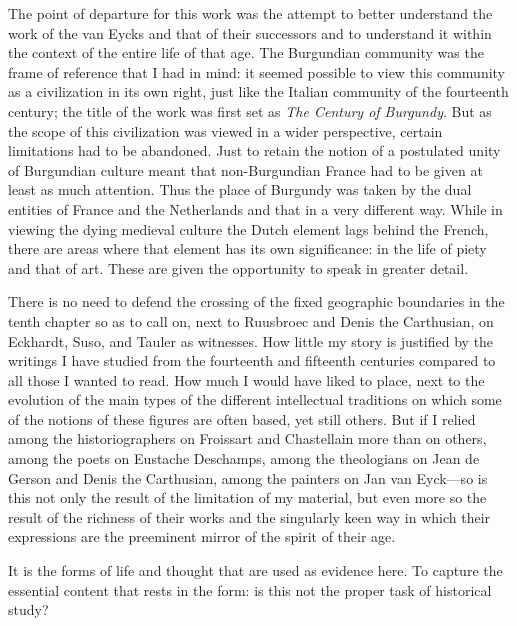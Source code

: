 The point of departure for this work was the attempt to better
understand the work of the van Eycks and that of their successors and to
understand it within the context of the entire life of that age. The
Burgundian community was the frame of reference that I had in mind: it
seemed possible to view this community as a civilization in its own
right, just like the Italian community of the fourteenth century; the
title of the work was first set as \emph{The Century of Burgundy}. But
as the scope of this civilization was viewed in a wider perspective,
certain limitations had to be abandoned. Just to retain the notion of a
postulated unity of Burgundian culture meant that non-Burgundian France
had to be given at least as much attention. Thus the place of Burgundy
was taken by the dual entities of France and the Netherlands and that in
a very different way. While in viewing the dying medieval culture the
Dutch element lags behind the French, there are areas where that element
has its own significance: in the life of piety and that of art. These
are given the opportunity to speak in greater detail.

There is no need to defend the crossing of the fixed geographic
boundaries in the tenth chapter so as to call on, next to Ruusbroec and
Denis the Carthusian, on Eckhardt, Suso, and Tauler as witnesses. How
little my story is justified by the writings I have studied from the
fourteenth and fifteenth centuries compared to all those I wanted to
read. How much I would have liked to place, next to the evolution of the
main types of the different intellectual traditions on which some of the
notions of these figures are often based, yet still others. But if I
relied among the historiographers on Froissart and Chastellain more than
on others, among the poets on Eustache Deschamps, among the theologians
on Jean de Gerson and Denis the Carthusian, among the painters on Jan
van Eyck---so is this not only the result of the limitation of my
material, but even more so the result of the richness of their works and
the singularly keen way in which their expressions are the preeminent
mirror of the spirit of their age.

It is the forms of life and thought that are used as evidence here. To
capture the essential content that rests in the form: is this not the
proper task of historical study?
